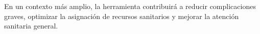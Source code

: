 \documentclass[12pt,letterpaper]{report}
\begin{document}
En un contexto más amplio, la herramienta contribuirá a reducir complicaciones graves, optimizar la asignación de recursos sanitarios y mejorar la atención sanitaria general.
%
%
%    
%


\tableofcontents
\newpage

\end{document}
